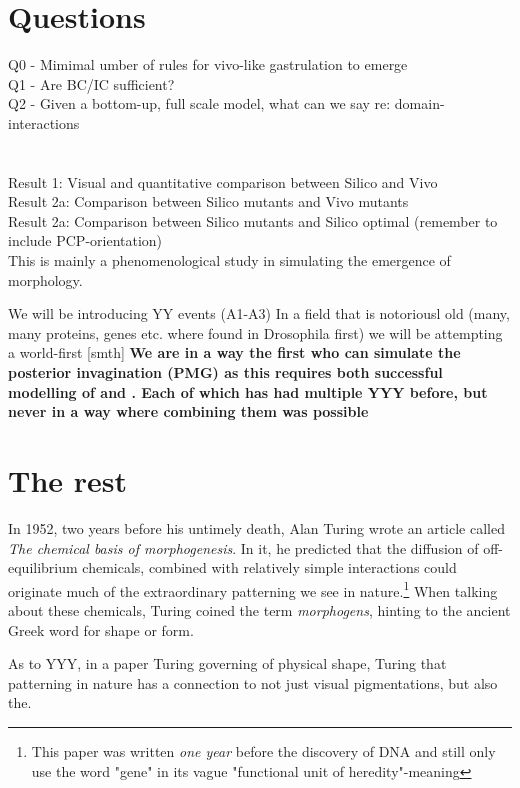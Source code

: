 
\section{Questions}
Q0 - Mimimal umber of rules for vivo-like gastrulation to emerge\\
Q1 - Are BC/IC sufficient?\\
Q2 - Given a bottom-up, full scale model, what can we say re: domain-interactions\\
\\\\
Result 1: Visual and quantitative comparison between Silico and Vivo\\
Result 2a: Comparison between Silico mutants and Vivo mutants\\
Result 2a: Comparison between Silico mutants and Silico optimal (remember to include PCP-orientation)\\

This is mainly a phenomenological study in simulating the emergence of morphology.

We will be introducing YY events (A1-A3)
In a field that is notoriousl old (many, many proteins, genes etc. where found in Drosophila first) we will be attempting a world-first [smth]
\textbf{We are in a way the first who can simulate the posterior invagination (PMG)  as this requires both successful modelling of  and . Each of which has had multiple YYY before, but never in a way where combining them was possible}

\section{The rest}
In 1952, two years before his untimely death, Alan Turing wrote an article called
\textit{The chemical basis of morphogenesis}.\cite{turing52the} In it, he predicted that the diffusion of off-equilibrium chemicals, combined with relatively simple interactions could originate much of the extraordinary patterning we see in nature.\footnote{This paper was written \textit{one year} before the discovery of DNA and still only use the word "gene" in its vague "functional unit of heredity"-meaning} When talking about these chemicals, Turing coined the term \textit{morphogens}, hinting to the ancient Greek word for shape or form. 

As to YYY, in a paper Turing governing of physical shape, Turing that patterning in nature has a connection to not just visual pigmentations, but also the. \\


